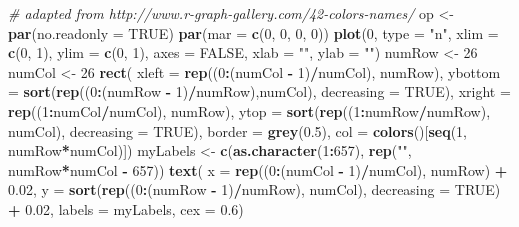 \documentclass[
]{book}
\newenvironment{Shaded}{\begin{snugshade}}{\end{snugshade}}
\newcommand{\CommentTok}[1]{\textcolor[rgb]{0.56,0.35,0.01}{\textit{#1}}}
\newcommand{\DataTypeTok}[1]{\textcolor[rgb]{0.13,0.29,0.53}{#1}}
\newcommand{\DecValTok}[1]{\textcolor[rgb]{0.00,0.00,0.81}{#1}}
\newcommand{\FloatTok}[1]{\textcolor[rgb]{0.00,0.00,0.81}{#1}}
\newcommand{\KeywordTok}[1]{\textcolor[rgb]{0.13,0.29,0.53}{\textbf{#1}}}
\newcommand{\NormalTok}[1]{#1}
\newcommand{\OperatorTok}[1]{\textcolor[rgb]{0.81,0.36,0.00}{\textbf{#1}}}
\newcommand{\OtherTok}[1]{\textcolor[rgb]{0.56,0.35,0.01}{#1}}
\newcommand{\StringTok}[1]{\textcolor[rgb]{0.31,0.60,0.02}{#1}}
\begin{document}
\begin{Shaded}
\begin{Highlighting}[]
\CommentTok{# adapted from http://www.r-graph-gallery.com/42-colors-names/}
\NormalTok{op <-}\StringTok{ }\KeywordTok{par}\NormalTok{(}\DataTypeTok{no.readonly =} \OtherTok{TRUE}\NormalTok{)}
\KeywordTok{par}\NormalTok{(}\DataTypeTok{mar =} \KeywordTok{c}\NormalTok{(}\DecValTok{0}\NormalTok{, }\DecValTok{0}\NormalTok{, }\DecValTok{0}\NormalTok{, }\DecValTok{0}\NormalTok{))}
\KeywordTok{plot}\NormalTok{(}\DecValTok{0}\NormalTok{, }\DataTypeTok{type =} \StringTok{"n"}\NormalTok{, }\DataTypeTok{xlim =} \KeywordTok{c}\NormalTok{(}\DecValTok{0}\NormalTok{, }\DecValTok{1}\NormalTok{), }\DataTypeTok{ylim =} \KeywordTok{c}\NormalTok{(}\DecValTok{0}\NormalTok{, }\DecValTok{1}\NormalTok{), }
  \DataTypeTok{axes =} \OtherTok{FALSE}\NormalTok{, }\DataTypeTok{xlab =} \StringTok{""}\NormalTok{, }\DataTypeTok{ylab =} \StringTok{""}\NormalTok{)}
\NormalTok{numRow <-}\StringTok{ }\DecValTok{26}
\NormalTok{numCol <-}\StringTok{ }\DecValTok{26}
\KeywordTok{rect}\NormalTok{(}
  \DataTypeTok{xleft =} \KeywordTok{rep}\NormalTok{((}\DecValTok{0}\OperatorTok{:}\NormalTok{(numCol }\OperatorTok{-}\StringTok{ }\DecValTok{1}\NormalTok{)}\OperatorTok{/}\NormalTok{numCol), numRow),  }
  \DataTypeTok{ybottom =} \KeywordTok{sort}\NormalTok{(}\KeywordTok{rep}\NormalTok{((}\DecValTok{0}\OperatorTok{:}\NormalTok{(numRow }\OperatorTok{-}\StringTok{ }\DecValTok{1}\NormalTok{)}\OperatorTok{/}\NormalTok{numRow),numCol), }\DataTypeTok{decreasing =} \OtherTok{TRUE}\NormalTok{),}
  \DataTypeTok{xright =} \KeywordTok{rep}\NormalTok{((}\DecValTok{1}\OperatorTok{:}\NormalTok{numCol}\OperatorTok{/}\NormalTok{numCol), numRow),}
  \DataTypeTok{ytop =} \KeywordTok{sort}\NormalTok{(}\KeywordTok{rep}\NormalTok{((}\DecValTok{1}\OperatorTok{:}\NormalTok{numRow}\OperatorTok{/}\NormalTok{numRow), numCol), }\DataTypeTok{decreasing =} \OtherTok{TRUE}\NormalTok{),}
  \DataTypeTok{border =} \KeywordTok{grey}\NormalTok{(}\FloatTok{0.5}\NormalTok{), }
  \DataTypeTok{col =} \KeywordTok{colors}\NormalTok{()[}\KeywordTok{seq}\NormalTok{(}\DecValTok{1}\NormalTok{, numRow}\OperatorTok{*}\NormalTok{numCol)])}
\NormalTok{myLabels <-}\StringTok{ }\KeywordTok{c}\NormalTok{(}\KeywordTok{as.character}\NormalTok{(}\DecValTok{1}\OperatorTok{:}\DecValTok{657}\NormalTok{), }\KeywordTok{rep}\NormalTok{(}\StringTok{""}\NormalTok{, numRow}\OperatorTok{*}\NormalTok{numCol }\OperatorTok{-}\StringTok{ }\DecValTok{657}\NormalTok{))}
\KeywordTok{text}\NormalTok{(}
  \DataTypeTok{x =} \KeywordTok{rep}\NormalTok{((}\DecValTok{0}\OperatorTok{:}\NormalTok{(numCol }\OperatorTok{-}\StringTok{ }\DecValTok{1}\NormalTok{)}\OperatorTok{/}\NormalTok{numCol), numRow) }\OperatorTok{+}\StringTok{ }\FloatTok{0.02}\NormalTok{,}
  \DataTypeTok{y =} \KeywordTok{sort}\NormalTok{(}\KeywordTok{rep}\NormalTok{((}\DecValTok{0}\OperatorTok{:}\NormalTok{(numRow }\OperatorTok{-}\StringTok{ }\DecValTok{1}\NormalTok{)}\OperatorTok{/}\NormalTok{numRow), numCol), }\DataTypeTok{decreasing =} \OtherTok{TRUE}\NormalTok{) }\OperatorTok{+}\StringTok{ }\FloatTok{0.02}\NormalTok{,}
  \DataTypeTok{labels =}\NormalTok{ myLabels, }
  \DataTypeTok{cex =} \FloatTok{0.6}\NormalTok{)}
\end{Highlighting}
\end{Shaded}
\end{document}
